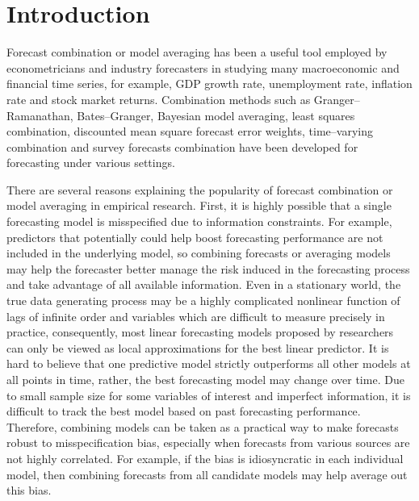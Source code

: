 \section{Introduction}
Forecast combination or model averaging has been a useful tool employed by econometricians and industry forecasters in studying many macroeconomic and financial time series, for example, GDP growth rate, unemployment rate, inflation rate and stock market returns. Combination methods such as Granger--Ramanathan, Bates--Granger, Bayesian model averaging, least squares combination, discounted mean square forecast error weights, time--varying combination and survey forecasts combination have been developed for forecasting under various settings.

There are several reasons explaining the popularity of forecast combination or model averaging in empirical research. First, it is highly possible that a single forecasting model is misspecified due to information constraints. For example, predictors that potentially could help boost forecasting performance are not included in the underlying model, so combining forecasts or averaging models may help the forecaster better manage the risk induced in the forecasting process and take advantage of all available information. Even in a stationary world, the true data generating process may be a highly complicated nonlinear function of lags of infinite order and variables which are difficult to measure precisely in practice, consequently, most linear forecasting models proposed by researchers can only be viewed as local approximations for the best linear predictor. It is hard to believe that one predictive model strictly outperforms all other models at all points in time, rather, the best forecasting model may change over time. Due to small sample size for some variables of interest and imperfect information, it is difficult to track the best model based on past forecasting performance. Therefore, combining models can be taken as a practical way to make forecasts robust to misspecification bias, especially when forecasts from various sources are not highly correlated. For example, if the bias is idiosyncratic in each individual model, then combining forecasts from all candidate models may help average out this bias.

